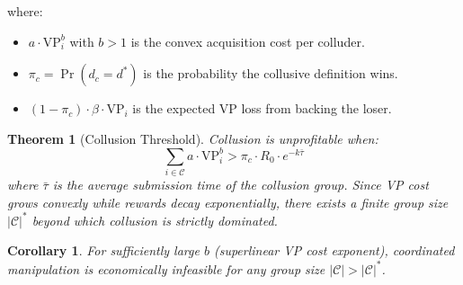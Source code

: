 \documentclass[11pt]{article}
\newtheorem{theorem}{Theorem}
\newtheorem{corollary}{Corollary}
\begin{document}
where:
\begin{itemize}[nosep]
  \item $a \cdot \text{VP}_i^b$ with $b > 1$ is the convex acquisition cost per colluder.
  \item $\pi_c = \Pr(d_c = d^*)$ is the probability the collusive definition wins.
  \item $(1 - \pi_c) \cdot \beta \cdot \text{VP}_i$ is the expected VP loss from backing the loser.
\end{itemize}

\begin{theorem}[Collusion Threshold]
Collusion is unprofitable when:
\begin{equation}
\sum_{i \in \mathcal{C}} a \cdot \text{VP}_i^b > \pi_c \cdot R_0 \cdot e^{-k\bar{\tau}}
\end{equation}
where $\bar{\tau}$ is the average submission time of the collusion group. Since VP cost grows convexly while rewards decay exponentially, there exists a finite group size $|\mathcal{C}|^*$ beyond which collusion is strictly dominated.
\end{theorem}

\begin{corollary}
For sufficiently large $b$ (superlinear VP cost exponent), coordinated manipulation is economically infeasible for any group size $|\mathcal{C}| > |\mathcal{C}|^*$.
\end{corollary}
\end{document}
